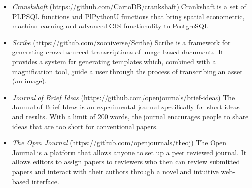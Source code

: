 \documentclass[10pt]{article}
\newenvironment{outerlist}[1][\enskip\textbullet]%
        {\begin{itemize}[#1]}{\end{itemize}%
         \vspace{-.6\baselineskip}}
\begin{document}
\begin{outerlist}

\item[]{\emph{Cranskshaft} (https://github.com/CartoDB/crankshaft)  Crankshaft is a set of PLPSQL functions and PlPythonU functions that bring spatial econometric, machine learning and advanced GIS functionality to PostgreSQL}

\item[]{\emph{Scribe} (https://github.com/zooniverse/Scribe)  Scribe is a framework for generating crowd-sourced transcriptions of image-based documents. It provides a system for generating templates which, combined with a magnification tool, guide a user through the process of transcribing an asset (an image).}

\item[]{\emph{Journal of Brief Ideas} (https://github.com/openjournals/brief-ideas) The Journal of Brief Ideas is an experimental journal specifically for short ideas and results. With a limit of 200 words, the journal encourages people to share ideas that are too short for conventional papers. }

\item[]{\emph{The Open Journal} (https://github.com/openjournals/theoj) The Open Journal is a platform that allows anyone to set up a peer reviewed journal. It allows editors to assign papers to reviewers who then can review submitted papers and interact with their authors through a novel and intuitive web-based interface. }

\end{outerlist}
\end{document}
